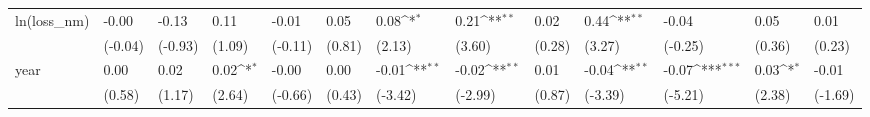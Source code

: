 \def\sym#1{\ifmmode^{#1}\else\(^{#1}\)\fi}
\begin{tabular}{p{1.5cm} p{1.7cm} p{1.7cm} p{1.7cm}  p{1.7cm} p{1.7cm} p{1.7cm} p{1.7cm} p{1.7cm}  p{1.7cm} p{1.7cm} p{1.7cm} p{1.7cm} }
\hline
ln(loss\_nm)     &    -0.00         &    -0.13         &     0.11         &    -0.01         &     0.05         &     0.08\sym{*}  &     0.21\sym{**} &     0.02         &     0.44\sym{**} &    -0.04         &     0.05         &     0.01         \\
                &  (-0.04)         &  (-0.93)         &   (1.09)         &  (-0.11)         &   (0.81)         &   (2.13)         &   (3.60)         &   (0.28)         &   (3.27)         &  (-0.25)         &   (0.36)         &   (0.23)         \\
year            &     0.00         &     0.02         &     0.02\sym{*}  &    -0.00         &     0.00         &    -0.01\sym{**} &    -0.02\sym{**} &     0.01         &    -0.04\sym{**} &    -0.07\sym{***}&     0.03\sym{*}  &    -0.01         \\
                &   (0.58)         &   (1.17)         &   (2.64)         &  (-0.66)         &   (0.43)         &  (-3.42)         &  (-2.99)         &   (0.87)         &  (-3.39)         &  (-5.21)         &   (2.38)         &  (-1.69)         \\
\end{tabular}
